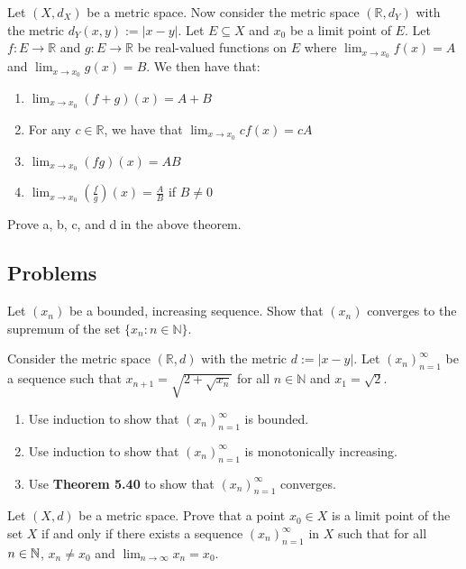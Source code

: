 \documentclass[../main.tex]{subfiles}
\begin{document}
\begin{theorem}
    Let $(X,d_X)$ be a metric space. Now consider the metric space $(\mathbb{R},d_Y)$ with the metric $d_{Y}(x,y) := |x-y|$. Let $E \subseteq X$ and $x_0$ be a limit point of $E$. Let $f: E \rightarrow \mathbb{R}$ and $g: E \rightarrow \mathbb{R}$ be real-valued functions on $E$ where $\lim_{x \to x_0}f(x)= A$ and $\lim_{x \to x_0}g(x)= B$. We then have that: 
    \begin{enumerate}[label=\alph*.]
        \item $\lim_{x \to x_0}(f+g)(x)= A + B$
        \item For any $c \in \mathbb{R}$, we have that $\lim_{x \to x_0}cf(x) = cA$
        \item $\lim_{x \to x_0}(fg)(x)= AB$
        \item $\lim_{x \to x_0}(\frac{f}{g})(x)= \frac{A}{B}$ if $B \neq 0$ \\
    \end{enumerate}
    
\end{theorem}
\begin{exercise}
    Prove a, b, c, and d in the above theorem. 
\end{exercise}





\subsection{Problems}


\begin{homework}
    Let $(x_n)$ be a bounded, increasing sequence. Show that $(x_n)$ converges to the supremum of the set $\{x_n:n\in\mathbb N\}$.
\end{homework}

\begin{homework}
     Consider the metric space $(\mathbb{R}, d)$ with the metric $ d := |x - y|$. Let $(x_n)^{\infty}_{n=1}$ be a sequence such that  $x_{n+1} = \sqrt{2 + \sqrt{x_n}}$ for all $n \in \mathbb{N}$ and $x_1 = \sqrt{2}$.
     
     \begin{enumerate}[label=\alph*.]
        \item Use induction to show that $(x_n)^{\infty}_{n=1}$ is bounded. 
        \item Use induction to show that $(x_n)^{\infty}_{n=1}$ is monotonically increasing.
        \item Use \textbf{Theorem 5.40} to show that $(x_n)^{\infty}_{n=1}$ converges.
     \end{enumerate}
\end{homework}
\begin{homework}
    Let $(X,d)$ be a metric space. Prove that a point $x_0 \in X$ is a limit point of the set $X$ if and only if there exists a sequence $(x_n)^{\infty}_{n=1}$ in $X$ such that for all $n \in \mathbb N $, $ x_n \neq x_0$ and $\lim_{n\to\infty}x_n = x_0$. 
\end{homework}
\end{document}

